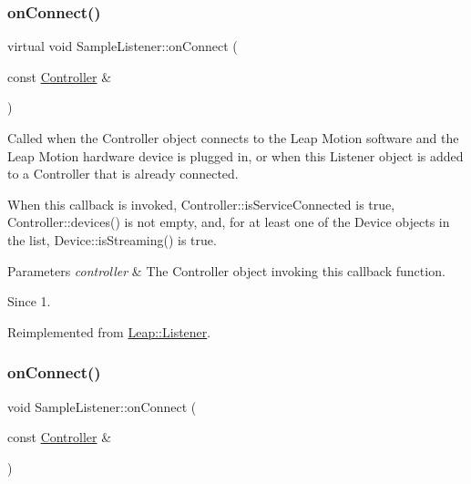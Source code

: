 \subsubsection{\texorpdfstring{on\+Connect()}{onConnect()}\hspace{0.1cm}{\footnotesize\ttfamily [1/2]}}
{\footnotesize\ttfamily virtual void Sample\+Listener\+::on\+Connect (\begin{DoxyParamCaption}\item[{const \hyperlink{class_leap_1_1_controller}{Controller} \&}]{ }\end{DoxyParamCaption})\hspace{0.3cm}{\ttfamily [virtual]}}

Called when the Controller object connects to the Leap Motion software and the Leap Motion hardware device is plugged in, or when this Listener object is added to a Controller that is already connected.

When this callback is invoked, Controller\+::is\+Service\+Connected is true, Controller\+::devices() is not empty, and, for at least one of the Device objects in the list, Device\+::is\+Streaming() is true.


\begin{DoxyCodeInclude}
\end{DoxyCodeInclude}



\begin{DoxyParams}{Parameters}
{\em controller} & The Controller object invoking this callback function. \\
\hline
\end{DoxyParams}
\begin{DoxySince}{Since}
1. 
\end{DoxySince}


Reimplemented from \hyperlink{class_leap_1_1_listener_adfef79f9a03b342384aaa17f3a8ebf15}{Leap\+::\+Listener}.

\mbox{\label{class_sample_listener_a91dfe9f4b35bca70a38237a7a09b4ebd}} 
\subsubsection{\texorpdfstring{on\+Connect()}{onConnect()}\hspace{0.1cm}{\footnotesize\ttfamily [2/2]}}
{\footnotesize\ttfamily void Sample\+Listener\+::on\+Connect (\begin{DoxyParamCaption}\item[{const \hyperlink{class_leap_1_1_controller}{Controller} \&}]{ }\end{DoxyParamCaption})\hspace{0.3cm}{\ttfamily [virtual]}}

